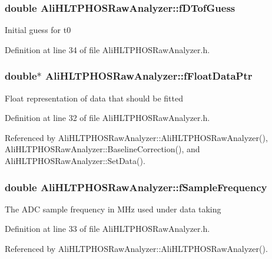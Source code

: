 \subsubsection{\setlength{\rightskip}{0pt plus 5cm}double {\bf Ali\-HLTPHOSRaw\-Analyzer::f\-DTof\-Guess}\hspace{0.3cm}{\tt  [protected, inherited]}}\label{classAliHLTPHOSRawAnalyzer_AliHLTPHOSRawAnalyzerPeakFinderp2}


Initial guess for t0 

Definition at line 34 of file Ali\-HLTPHOSRaw\-Analyzer.h.
\subsubsection{\setlength{\rightskip}{0pt plus 5cm}double$\ast$ {\bf Ali\-HLTPHOSRaw\-Analyzer::f\-Float\-Data\-Ptr}\hspace{0.3cm}{\tt  [protected, inherited]}}\label{classAliHLTPHOSRawAnalyzer_AliHLTPHOSRawAnalyzerPeakFinderp0}


Float representation of data that should be fitted 

Definition at line 32 of file Ali\-HLTPHOSRaw\-Analyzer.h.

Referenced by Ali\-HLTPHOSRaw\-Analyzer::Ali\-HLTPHOSRaw\-Analyzer(), Ali\-HLTPHOSRaw\-Analyzer::Baseline\-Correction(), and Ali\-HLTPHOSRaw\-Analyzer::Set\-Data().
\subsubsection{\setlength{\rightskip}{0pt plus 5cm}double {\bf Ali\-HLTPHOSRaw\-Analyzer::f\-Sample\-Frequency}\hspace{0.3cm}{\tt  [protected, inherited]}}\label{classAliHLTPHOSRawAnalyzer_AliHLTPHOSRawAnalyzerPeakFinderp1}


The ADC sample frequency in MHz used under data taking 

Definition at line 33 of file Ali\-HLTPHOSRaw\-Analyzer.h.

Referenced by Ali\-HLTPHOSRaw\-Analyzer::Ali\-HLTPHOSRaw\-Analyzer().
